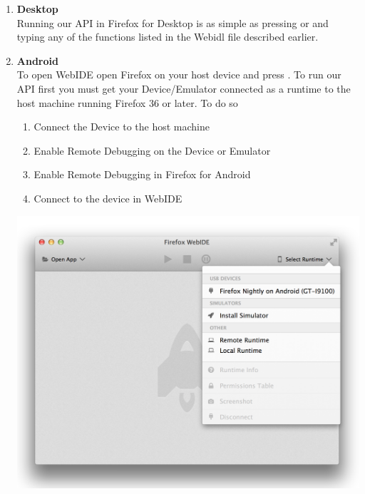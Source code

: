 \documentclass[12pt]{article}
\begin{document}
\begin{enumerate}
\item \textbf{Desktop} \\
Running our API in Firefox for Desktop is as simple as pressing  or  and typing any of the functions listed in the Webidl file described earlier. 
\item \textbf{Android} \\
To open WebIDE open Firefox on your host device and press . 
To run our API first you must get your Device/Emulator connected as a runtime to the host machine running Firefox 36 or later.  To do so 
\begin{enumerate}
\item Connect the Device to the host machine 
\item Enable Remote Debugging on the Device or Emulator
\item Enable Remote Debugging in Firefox for Android 
\item Connect to the device in WebIDE 
\end{enumerate}
\begin{center}
\includegraphics[scale=0.4]{remote-debugging-android-runtime} \\

\end{center}
\end{enumerate}
\end{document}
